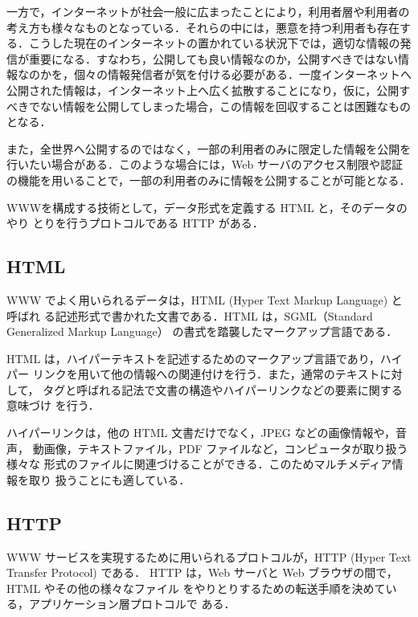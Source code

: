 一方で，インターネットが社会一般に広まったことにより，利用者層や利用者の
考え方も様々なものとなっている．それらの中には，悪意を持つ利用者も存在す
る．こうした現在のインターネットの置かれている状況下では，適切な情報の発
信が重要になる．すなわち，公開しても良い情報なのか，公開すべきではない情
報なのかを，個々の情報発信者が気を付ける必要がある．一度インターネットへ
公開された情報は，インターネット上へ広く拡散することになり，仮に，公開す
べきでない情報を公開してしまった場合，この情報を回収することは困難なもの
となる．

また，全世界へ公開するのではなく，一部の利用者のみに限定した情報を公開を
行いたい場合がある．このような場合には，Web サーバのアクセス制限や認証
の機能を用いることで，一部の利用者のみに情報を公開することが可能となる．

WWWを構成する技術として，データ形式を定義する HTML と，そのデータのやり
とりを行うプロトコルである HTTP がある．

\subsection{HTML}
WWW でよく用いられるデータは，HTML (Hyper Text Markup Language) と呼ばれ
る記述形式で書かれた文書である．HTML は，SGML（Standard Generalized Markup 
Language） の書式を踏襲したマークアップ言語である．

HTML は，ハイパーテキストを記述するためのマークアップ言語であり，ハイパー
リンクを用いて他の情報への関連付けを行う．また，通常のテキストに対して，
タグと呼ばれる記法で文書の構造やハイパーリンクなどの要素に関する意味づけ
を行う．

ハイパーリンクは，他の HTML 文書だけでなく，JPEG などの画像情報や，音声，
動画像，テキストファイル，PDF ファイルなど，コンピュータが取り扱う様々な
形式のファイルに関連づけることができる．このためマルチメディア情報を取り
扱うことにも適している．

\subsection{HTTP}


WWW サービスを実現するために用いられるプロトコルが，HTTP (Hyper Text
Transfer Protocol) である．
HTTP は，Web サーバと Web ブラウザの間で，HTML やその他の様々なファイル
をやりとりするための転送手順を決めている，アプリケーション層プロトコルで
ある．

